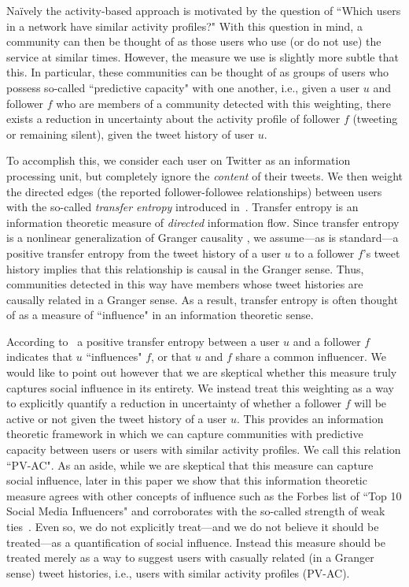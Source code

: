 Na\"ively the activity-based approach is motivated by the question of ``Which users in a network have similar activity profiles?"
 With this question in mind, a community can then be thought of as those users who use (or do not use) the service at similar times. However, the measure we use is slightly more subtle that this. In particular, these communities can be thought of as groups of users who possess so-called ``predictive capacity" with one another, i.e., given a user $u$ and follower $f$ who are members of a community detected with this weighting, there exists a reduction in uncertainty about the activity profile of follower $f$ (tweeting or remaining silent), given the tweet history of user $u$. 

To accomplish this, we consider each user on Twitter as an information processing unit, but completely ignore the \emph{content} of their tweets. We then weight the directed edges (the reported follower-followee relationships) between users with the so-called \emph{transfer entropy} introduced in~\cite{schreiber2000measuring}.  Transfer entropy is an information theoretic measure of \emph{directed} information flow. Since transfer entropy is a nonlinear generalization of Granger causality \cite{granger1963economic}, we assume---as is standard---a positive transfer entropy from the tweet history of a user $u$ to a follower $f$'s tweet history implies that this relationship is causal in the Granger sense.  Thus, communities detected in this way have members whose tweet histories are causally related in a Granger sense. As a result, transfer entropy is often thought of as a measure of ``influence" in an information theoretic sense. 

According to~\cite{ver2012information} a positive transfer entropy between a user $u$ and a follower $f$ indicates that $u$ ``influences" $f$, or that $u$ and $f$ share a common influencer. We would like to point out however that we are skeptical whether this measure truly captures social influence in its entirety. We instead treat this weighting as a way to explicitly quantify a reduction in uncertainty of whether a follower $f$ will be active or not given the tweet history of a user $u$. This provides an information theoretic framework in which we can capture communities with predictive capacity between users or users with similar activity profiles. We call this relation ``PV-AC". As an aside, while we are skeptical that this measure can capture social influence, later in this paper we show that this information theoretic measure agrees with other concepts of influence such as the Forbes list of ``Top 10 Social Media Influencers" and corroborates with the so-called strength of weak ties~\cite{granovetter1973strength}. Even so, we do not explicitly treat---and we do not believe it should be treated---as a quantification of social influence. Instead this measure should be treated merely as a way to suggest users with casually related (in a Granger sense) tweet histories, i.e., users with similar activity profiles (PV-AC).


